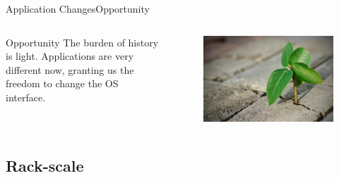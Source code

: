 \documentclass[10pt]{beamer}
\begin{document}
\begin{frame}{Application Changes}{Opportunity}
  \begin{columns}[T] %
    \begin{column}{.5\textwidth}
      \begin{block}{Opportunity}
        The burden of history is light. Applications are very different now,
        granting us the freedom to change the OS interface.
      \end{block}
    \end{column}

    \hfill
    \begin{column}{.4\textwidth}
      \begin{figure}[ht]
        \includegraphics[width=1\textwidth, keepaspectratio=true]{images/opportunity.png}
      \end{figure}
    \end{column}
  \end{columns}

\end{frame}

\subsection{Rack-scale}
\end{document}
